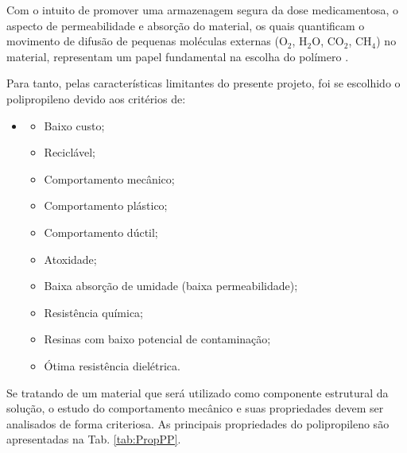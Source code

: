Com o intuito de promover uma armazenagem segura da dose medicamentosa, o aspecto de permeabilidade e absorção do material, os quais quantificam o movimento de difusão de pequenas moléculas externas (O$_2$, H$_2$O, CO$_2$, CH$_4$) no material, representam um papel fundamental na escolha do polímero \cite{materiais}.  

Para tanto, pelas características limitantes do presente projeto, foi se escolhido o polipropileno devido aos critérios de: 

\begin{itemize} 

    \item[ ] 

    \begin{itemize} 
        \item Baixo custo; 
        \item Reciclável;
        \item Comportamento mecânico;  
        \item Comportamento plástico;
        \item Comportamento dúctil; 
        \item Atoxidade;
        \item Baixa absorção de umidade (baixa permeabilidade); 
        \item Resistência química; 
        \item Resinas com baixo potencial de contaminação;
        \item Ótima resistência dielétrica.
    \end{itemize} 

\end{itemize} 

Se tratando de um material que será utilizado como componente estrutural da solução, o estudo do comportamento mecânico e suas propriedades devem ser analisados de forma criteriosa. As principais propriedades do polipropileno são apresentadas na Tab. \ref{tab:PropPP}.  

